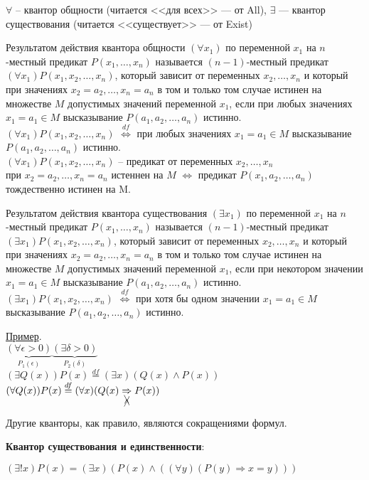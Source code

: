 $\forall$ -- квантор общности (читается <<для всех>> --- от All), $\exists$ --- квантор существования (читается <<существует>> --- от Exist)

\dftion Результатом действия квантора общности $(\forall x_1)$ по переменной $x_1$ на $n$-местный предикат $P(x_1,\dots, x_n)$ называется $(n-1)$-местный предикат $(\forall x_1)P(x_1,x_2,\dots,x_n)$, который зависит от переменных $x_2,\dots,x_n$ и который при значениях $x_2=a_2,\dots,x_n=a_n$ в том и только том случае истинен на множестве $M$ допустимых значений переменной $x_1$, если при любых значениях $x_1 = a_1 \in M$ высказывание $P(a_1, a_2, \dots, a_n)$ истинно. \\
$(\forall x_1)P(x_1,x_2,\dots,x_n)$ $\overset{df}\Leftrightarrow$ при любых значениях $x_1 = a_1 \in M$ высказывание $P(a_1, a_2, \dots, a_n)$ истинно. \\
$(\forall x_1)P(x_1,x_2,\dots,x_n)$ -- предикат от переменных $x_2,\dots,x_n$ \\
при $x_2 = a_2,\dots,x_n = a_n$ истеннен на $M$ $\Leftrightarrow$ предикат $P(x_1, a_2, \dots, a_n)$ тождественно истинен на M.


\dftion Результатом действия квантора существования $(\exists x_1)$ по переменной $x_1$ на $n$-местный предикат $P(x_1,\dots, x_n)$ называется $(n-1)$-местный предикат $(\exists x_1)P(x_1,x_2,\dots,x_n)$, который зависит от переменных $x_2,\dots,x_n$ и который при значениях $x_2=a_2,\dots,x_n=a_n$ в том и только том случае истинен на множестве $M$ допустимых значений переменной $x_1$, если при некотором значении $x_1 = a_1 \in M$ высказывание $P(a_1, a_2, \dots, a_n)$ истинно. \\
$(\exists x_1)P(x_1,x_2,\dots,x_n)$ $\overset{df}\Leftrightarrow$ при хотя бы одном значении $x_1 = a_1 \in M$ высказывание $P(a_1, a_2, \dots, a_n)$ истинно.

\underline{Пример}. \\
$\underset{P_1(\epsilon)}{\underbrace{(\forall \epsilon > 0)}} \underset{P_2(\delta)}{\underbrace{(\exists \delta > 0)}}$ \\
$(\exists Q(x))P(x) \overset{df}= (\exists x)(Q(x) \land P(x))$
$(\forall Q(x))P(x) \overset{df}= (\forall x)(Q(x) \underset{\bcancel{\cancel{\land}}}\Rightarrow P(x))$


Другие кванторы, как правило, являются сокращениями формул.


\dftion \textbf{Квантор существования и единственности}:

$(\exists ! x)P(x) = (\exists x)(P(x) \land ((\forall y)(P(y) \Rightarrow x = y)))$

